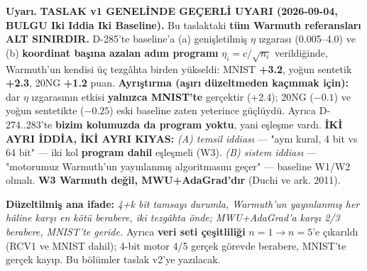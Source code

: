 \documentclass[11pt]{article}
\newenvironment{notkutu}{\def\FrameCommand{\fboxsep=6pt\colorbox{kutu}}\MakeFramed{\advance\hsize-\width\FrameRestore}\small}{\endMakeFramed}
\begin{document}
\begin{notkutu}\textbf{Uyarı.} \textbf{TASLAK v1 GENELİNDE GEÇERLİ UYARI (2026-09-04, BULGU Iki Iddia Iki Baseline).} Bu taslaktaki \textbf{tüm Warmuth referansları ALT SINIRDIR.} D-285'te baseline'a (a) genişletilmiş $\eta$ ızgarası (0.005–4.0) ve (b) \textbf{koordinat başına azalan adım programı} $\eta_i=c/\sqrt{n_i}$ verildiğinde, Warmuth'un kendisi üç tezgâhta birden yükseldi: MNIST \textbf{+3.2}, yoğun sentetik \textbf{+2.3}, 20NG \textbf{+1.2} puan. \textbf{Ayrıştırma (aşırı düzeltmeden kaçınmak için):} dar $\eta$ ızgarasının etkisi \textbf{yalnızca MNIST'te} gerçektir (+2.4); 20NG ($-0.1$) ve yoğun sentetikte ($-0.25$) eski baseline zaten yeterince güçlüydü. Ayrıca D-274..283'te \textbf{bizim kolumuzda da program yoktu}, yani eşleşme vardı. \textbf{İKİ AYRI İDDİA, İKİ AYRI KIYAS:} \emph{(A) temsil iddiası} — "aynı kural, 4 bit vs 64 bit" — iki kol \textbf{program dahil} eşleşmeli (W3). \emph{(B) sistem iddiası} — "motorumuz Warmuth'un yayınlanmış algoritmasını geçer" — baseline W1/W2 olmalı. \textbf{W3 Warmuth değil, MWU+AdaGrad'dır} (Duchi ve ark. 2011).
\begin{center}\small{}\end{center}
\textbf{Düzeltilmiş ana ifade:} \emph{4+k bit tamsayı durumla, Warmuth'un yayınlanmış her hâline karşı en kötü berabere, iki tezgâhta önde; MWU+AdaGrad'a karşı 2/3 berabere, MNIST'te geride.} Ayrıca \textbf{veri seti çeşitliliği} $n{=}1\to n{=}5$'e çıkarıldı (RCV1 ve MNIST dahil); 4-bit motor 4/5 gerçek görevde berabere, MNIST'te gerçek kayıp. Bu bölümler taslak v2'ye yazılacak.
\end{notkutu}
\end{document}
